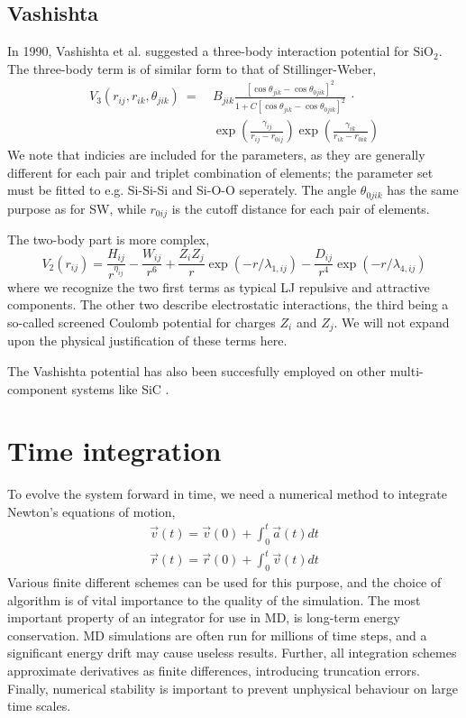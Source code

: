 \documentclass[twoside,english]{uiofysmaster}
\begin{document}
\subsection{Vashishta}
In 1990, Vashishta et al. \cite{Vashishta90} suggested a three-body interaction potential for $\mathrm{SiO}_2$. 
The three-body term is of similar form to that of Stillinger-Weber, 
\begin{equation}
\begin{aligned}
 V_3(r_{ij}, r_{ik}, \theta_{jik}) \: = \:
 &B_{jik}\frac{[\cos\theta_{jik} - \cos\theta_{0jik}]^2}{1 + C[\cos\theta_{jik} - \cos\theta_{0jik}]^2} \: \cdot \\
 &\exp\left(\frac{\gamma_{ij}}{r_{ij} - r_{0ij}}\right)
 \exp\left(\frac{\gamma_{ik}}{r_{ik} - r_{0ik}}\right)
\end{aligned}
\end{equation}
We note that indicies are included for the parameters, as they are generally different for each pair and triplet combination
of elements; the parameter set must be fitted to e.g. Si-Si-Si and Si-O-O seperately. The angle $\theta_{0jik}$ has 
the same purpose as for SW, while $r_{0ij}$ is the cutoff distance for each pair of elements. 

\noindent The two-body part is more complex,
\begin{equation}
 V_2(r_{ij}) = \frac{H_{ij}}{r^{\eta_{ij}}} - \frac{W_{ij}}{r^6} + \frac{Z_iZ_j}{r}\exp(-r/\lambda_{1,ij}) - 
 \frac{D_{ij}}{r^4}\exp(-r/\lambda_{4,ij}) 
\end{equation}
where we recognize the two first terms as typical LJ repulsive and attractive components. The other two describe
electrostatic interactions, the third being a so-called screened Coulomb potential for charges $Z_i$ and $Z_j$. 
We will not expand upon the physical justification of these terms here. 

The Vashishta potential has also been succesfully employed on other multi-component systems like SiC \cite{Vashishta07}. 


\section{Time integration}
To evolve the system forward in time, we need a numerical method to integrate Newton's equations of motion,
\begin{align}
 \vec{v}(t) = \vec{v}(0) + \int_0^t\vec{a}(t)dt \label{equationsOfMotion1} \\
 \vec{r}(t) = \vec{r}(0) + \int_0^t\vec{v}(t)dt
 \label{equationsOfMotion2}
\end{align}
Various finite different schemes can be used for this purpose, and the choice of algorithm is 
of vital importance to the quality of the simulation. The most important property of an integrator
for use in MD, is long-term energy conservation. MD simulations are often run for millions of time steps, 
and a significant energy drift may cause useless results. Further, all integration schemes approximate 
derivatives as finite differences, introducing truncation errors. Finally, numerical stability is
important to prevent unphysical behaviour on large time scales. 
\end{document}
